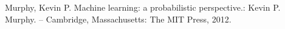 \documentclass[a4paper,12pt]{article}
\begin{document}
	
	\tableofcontents \newpage

	
	\newpage
	\begin{thebibliography}{99}
		 Murphy, Kevin P. Machine learning: a probabilistic perspective.: Kevin P. Murphy. -- Cambridge, Massachusetts: The MIT Press, 2012.
	\end{thebibliography}
	
	\newpage
	
\end{document}
